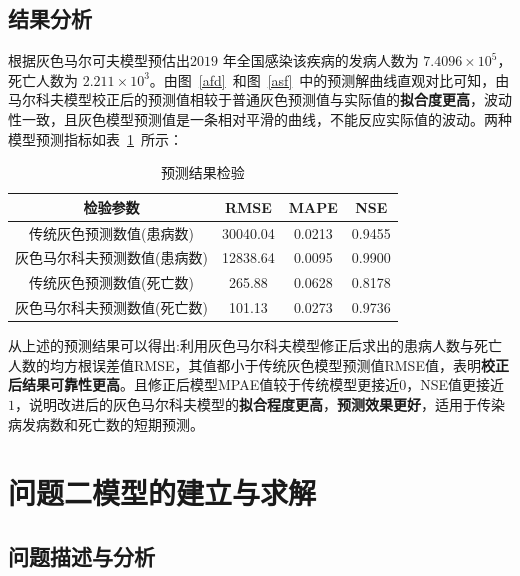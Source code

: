 \documentclass{whutmod}
\begin{document}
   \subsection{结果分析}


	根据灰色马尔可夫模型预估出$ 2019$ 年全国感染该疾病的发病人数为 $7.4096\times  10^{5}$，死亡人数为 $2.211\times  10^{3}
	$。由图~\ref{afd}~和图~\ref{asf}~中的预测解曲线直观对比可知，由马尔科夫模型校正后的预测值相较于普通灰色预测值与实际值的\textbf{拟合度更高}，波动性一致，且灰色模型预测值是一条相对平滑的曲线，不能反应实际值的波动。两种模型预测指标如表~\ref{jjj}~所示：

 \begin{table}[H]
	\centering\caption{预测结果检验}\label{jjj}
	\begin{tabular}{cccc}
		\toprule[1.5pt]
		\multicolumn{1}{m{6cm}}{\centering 检验参数}
		& \multicolumn{1}{m{2cm}}{\centering RMSE}
		& \multicolumn{1}{m{2cm}}{\centering MAPE}
		& \multicolumn{1}{m{2cm}}{\centering NSE}
		\\
			\midrule[0.5pt]	
	    传统灰色预测数值(患病数) &   30040.04 &  0.0213 & 0.9455\\ 
		灰色马尔科夫预测数值(患病数)&  12838.64  &  0.0095  &  0.9900 \\ 
		传统灰色预测数值(死亡数) &  265.88   & 0.0628   &0.8178  \\
		灰色马尔科夫预测数值(死亡数) &   101.13 &   0.0273 & 0.9736  \\   
		\bottomrule[1.5pt]	
	\end{tabular}
\end{table} 

从上述的预测结果可以得出:利用灰色马尔科夫模型修正后求出的患病人数与死亡人数的均方根误差值RMSE，其值都小于传统灰色模型预测值RMSE值，表明\textbf{校正后结果可靠性更高}。且修正后模型MPAE值较于传统模型更接近$0$，NSE值更接近 $1$，说明改进后的灰色马尔科夫模型的\textbf{拟合程度更高}，\textbf{预测效果更好}，适用于传染病发病数和死亡数的短期预测。


	  
	  \section{问题二模型的建立与求解}
	  \subsection{问题描述与分析}
\end{document}
